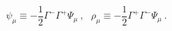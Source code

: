 \begin{equation}
\psi_\mu \equiv - \frac{1}{2} \Gamma^- \Gamma^+ \Psi_\mu ~,~~~
\rho_\mu \equiv - \frac{1}{2} \Gamma^+ \Gamma^- \Psi_\mu ~.
\label{d3/2-d}
\end{equation}

